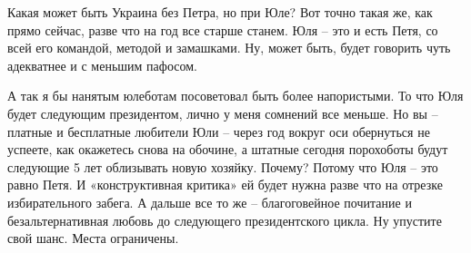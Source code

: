 Какая может быть Украина без Петра, но при Юле? Вот точно такая же, как прямо
сейчас, разве что на год все старше станем. Юля – это и есть Петя, со всей его
командой, методой и замашками. Ну, может быть, будет говорить чуть адекватнее и
с меньшим пафосом.

А так я бы нанятым юлеботам посоветовал быть более напористыми. То что Юля
будет следующим президентом, лично у меня сомнений все меньше. Но вы – платные
и бесплатные любители Юли – через год вокруг оси обернуться не успеете, как
окажетесь снова на обочине, а штатные сегодня порохоботы будут следующие 5 лет
облизывать новую хозяйку. Почему? Потому что Юля – это равно Петя. И
«конструктивная критика» ей будет нужна разве что на отрезке избирательного
забега. А дальше все то же – благоговейное почитание и безальтернативная любовь
до следующего президентского цикла. Ну упустите свой шанс. Места ограничены.

